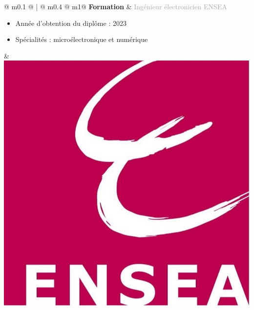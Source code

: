 \documentclass{article}
\begin{document}
\begin{tabular}{@{\hspace{0.05\textwidth}} m{0.1\textwidth} @ {\hspace{0.05\textwidth}} ! {\color{antiEnsea}\vline width 2pt \hspace{0.05\textwidth}} @ {}m{0.4\textwidth} @{\hspace{0.15\textwidth}} m{1\linewidth}@{}}
    \textcolor{antiEnsea}{\textbf{Formation}} & 
    \textcolor{darkGray}{Ingénieur électronicien ENSEA}
    \begin{itemize}[label={\textcolor{gray!80}{\checkmark}}, topsep=0pt, partopsep=0pt, itemsep=0pt, parsep=0pt, after=\vspace*{-\baselineskip}]
        \item \textcolor{gray!80}{Année d'obtention du diplôme : 2023}
        \item \textcolor{gray!80}{Spécialités : microélectronique et numérique} 
    \end{itemize} &
    \includegraphics[width=0.1\linewidth]{ensea.jpg}
\end{tabular}


\end{document}
